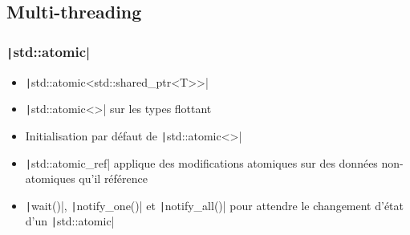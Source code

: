 \documentclass[C++.tex]{subfiles}
\begin{document}
\subsection*{Multi-threading}
\begin{frame}[fragile]
	\frametitle{\texttt|std::atomic|}
	\begin{itemize}
		\item \texttt|std::atomic<std::shared_ptr<T>>|
		\item \texttt|std::atomic<>| sur les types flottant
		\item Initialisation par défaut de \texttt|std::atomic<>|
		\item \texttt|std::atomic_ref| applique des modifications atomiques sur des données non-atomiques qu'il référence
		\item \texttt|wait()|, \texttt|notify_one()| et \texttt|notify_all()| pour attendre le changement d'état d'un \texttt|std::atomic|
	\end{itemize}

\end{frame}
\end{document}
